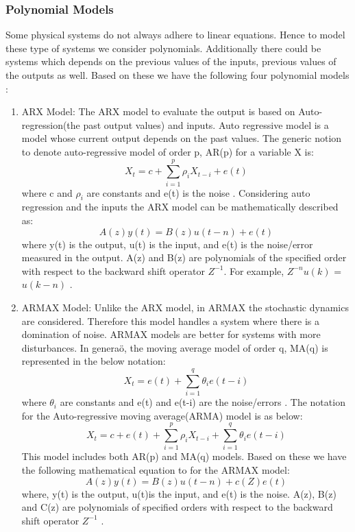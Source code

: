 \documentclass[article,type=msc,colorback,12pt,accentcolor=tud7b]{tudthesis}
\begin{document}
\subsubsection{Polynomial Models}
	
	Some physical systems do not always adhere to linear equations. Hence to model these type of systems we consider polynomials. Additionally there could be systems which depends on the previous values of the inputs, previous values of the outputs as well. Based on these we have the following four polynomial models \cite{ljung1998system}:
	
	\begin{enumerate}
		\item{ARX Model:} The ARX model to evaluate the output is based on Auto-regression(the past output values) and inputs. Auto regressive model is a model whose current output depends on the past values. The generic notion to denote auto-regressive model of order p, AR(p) for a variable X is: $$ X_t = c + \sum_{i=1}^{p} \rho_i X_{t-i} + e(t) $$ where c and $ \rho_i $ are constants and e(t) is the noise \cite{arma}. Considering auto regression and the inputs the ARX model can be mathematically described as: $$ A(z) y(t) = B(z) u(t-n) + e(t) $$ where y(t) is the output, u(t) is the input, and e(t) is the noise/error measured in the output. A(z) and B(z) are polynomials of the specified order with respect to the backward shift operator $Z^{-1}$. For example, $Z^{-n}  u(k)$ = $u(k-n)$ \cite{arx}.
		
	\item{ARMAX Model:} Unlike the ARX model, in ARMAX the stochastic dynamics are considered. Therefore this model handles a system where there is a domination of noise. ARMAX models are better for systems with more disturbances. In generaö, the moving average model of order q, MA(q) is represented in the below notation: $$ X_t =  e(t) + \sum_{i=1}^{q} \theta_i e(t-i) $$ where $ \theta_i $ are constants and e(t) and e(t-i) are the noise/errors \cite{arma}. The notation for the Auto-regressive moving average(ARMA) model is as below: $$ X_t = c + e(t) + \sum_{i=1}^{p} \rho_i X_{t-i} + \sum_{i=1}^{q} \theta_i e(t-i) $$ This model includes both AR(p) and MA(q) models. Based on these we have the following mathematical equation to for the ARMAX model: $$ A(z) y(t) = B(z) u(t-n) + c(Z) e(t) $$ where, y(t) is the output, u(t)is the input, and e(t) is the noise. A(z), B(z) and C(z) are polynomials of specified orders with respect to the backward shift operator $Z^{-1}$ \cite{armax}. 
	

\end{enumerate}
\end{document}
